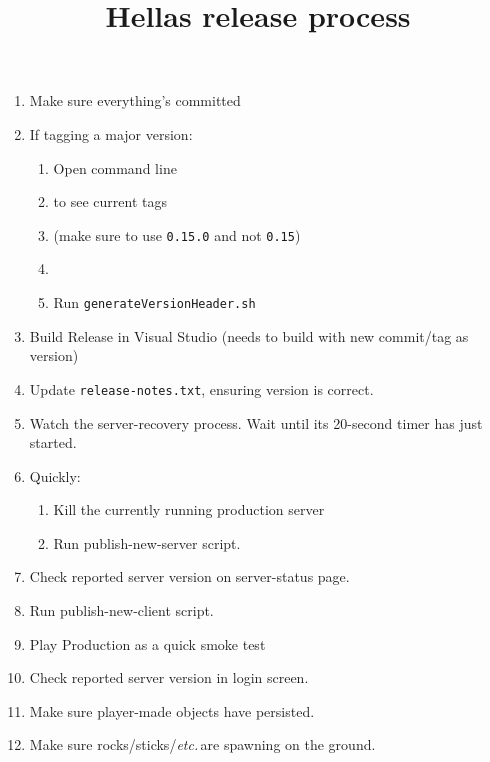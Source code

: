 \documentclass[12pt]{article}
\begin{document}

\title{Hellas release process}
\author{}
\maketitle

\begin{enumerate}

\item Make sure everything's committed
\item If tagging a major version:
    \begin{enumerate}
    \item Open command line
    \item {} to see current tags
    \item {} (make sure to use \texttt{0.15.0} and not \texttt{0.15})
    \item {}
    \item Run \texttt{generateVersionHeader.sh}
    \end{enumerate}

\item Build Release in Visual Studio (needs to build with new commit/tag as version)
\item Update \texttt{release-notes.txt}, ensuring version is correct.
\item Watch the server-recovery process.  Wait until its 20-second timer has just started.
\item Quickly:
\begin{enumerate}
    \item Kill the currently running production server
    \item Run publish-new-server script.
\end{enumerate}
\item Check reported server version on server-status page.
\item Run publish-new-client script.
\item Play Production as a quick smoke test
\item Check reported server version in login screen.
\item Make sure player-made objects have persisted.
\item Make sure rocks/sticks/\emph{etc.}\,are spawning on the ground.

\end{enumerate}
\end{document}
